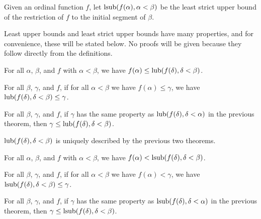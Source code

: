 \documentclass[../../math.tex]{subfiles}
\begin{document}
\begin{definition}
    Given an ordinal function $f$, let $\operatorname{lsub}(f(\alpha), \alpha < \beta)$ be the
    least strict upper bound of the restriction of $f$ to the initial segment of
    $\beta$.
\end{definition}

Least upper bounds and least strict upper bounds have many properties, and for
convenience, these will be stated below.  No proofs will be given because they
follow directly from the definitions.

\begin{theorem} \label{ord_lub_ge}
    For all $\alpha$, $\beta$, and $f$ with $\alpha < \beta$, we have $f(\alpha)
    \leq \operatorname{lub}(f(\delta), \delta < \beta)$.
\end{theorem}

\begin{theorem} \label{ord_lub_least}
    For all $\beta$, $\gamma$, and $f$, if for all $\alpha < \beta$ we have
    $f(\alpha) \leq \gamma$, we have $\operatorname{lub}(f(\delta), \delta < \beta) \leq
    \gamma$.
\end{theorem}

\begin{theorem} \label{ord_lub_other_leq}
    For all $\beta$, $\gamma$, and $f$, if $\gamma$ has the same property as
    $\operatorname{lub}(f(\delta), \delta < \alpha)$ in the previous theorem, then $\gamma
    \leq \operatorname{lub}(f(\delta), \delta < \beta)$.
\end{theorem}

\begin{theorem} \label{ord_lub_eq}
    $\operatorname{lub}(f(\delta), \delta < \beta)$ is uniquely described by the previous two
    theorems.
\end{theorem}

\begin{theorem} \label{ord_lsub_gt}
    For all $\alpha$, $\beta$, and $f$ with $\alpha < \beta$, we have $f(\alpha)
    < \operatorname{lsub}(f(\delta), \delta < \beta)$.
\end{theorem}

\begin{theorem} \label{ord_lsub_least}
    For all $\beta$, $\gamma$, and $f$, if for all $\alpha < \beta$ we have
    $f(\alpha) < \gamma$, we have $\operatorname{lsub}(f(\delta), \delta < \beta) \leq
    \gamma$.
\end{theorem}

\begin{theorem} \label{ord_lsub_other_leq}
    For all $\beta$, $\gamma$, and $f$, if $\gamma$ has the same property as
    $\operatorname{lsub}(f(\delta), \delta < \alpha)$ in the previous theorem, then $\gamma
    \leq \operatorname{lsub}(f(\delta), \delta < \beta)$.
\end{theorem}
\end{document}

